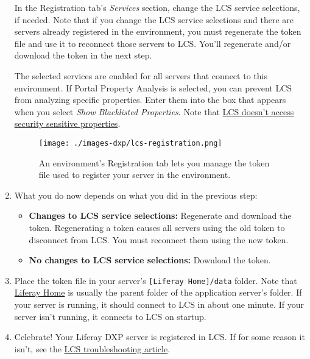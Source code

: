 \begin{enumerate}
  In the Registration tab's \emph{Services} section, change the LCS
  service selections, if needed. Note that if you change the LCS service
  selections and there are servers already registered in the
  environment, you must regenerate the token file and use it to
  reconnect those servers to LCS. You'll regenerate and/or download the
  token in the next step.

  The selected services are enabled for all servers that connect to this
  environment. If Portal Property Analysis is selected, you can prevent
  LCS from analyzing specific properties. Enter them into the box that
  appears when you select \emph{Show Blacklisted Properties}. Note that
  \href{/docs/7-0/deploy/-/knowledge_base/d/using-lcs\#what-lcs-stores-about-your-liferay-servers}{LCS
  doesn't access security sensitive properties}.

  \begin{figure}
  \centering
  \texttt{[image: ./images-dxp/lcs-registration.png]}
  \caption{An environment's Registration tab lets you manage the token
  file used to register your server in the environment.}
  \end{figure}
\item
  What you do now depends on what you did in the previous step:

  \begin{itemize}
  \tightlist
  \item
    \textbf{Changes to LCS service selections:} Regenerate and download
    the token. Regenerating a token causes all servers using the old
    token to disconnect from LCS. You must reconnect them using the new
    token.
  \item
    \textbf{No changes to LCS service selections:} Download the token.
  \end{itemize}
\item
  Place the token file in your server's
  \texttt{{[}Liferay\ Home{]}/data} folder. Note that
  \href{/docs/7-0/deploy/-/knowledge_base/d/installing-product\#liferay-home}{Liferay
  Home} is usually the parent folder of the application server's folder.
  If your server is running, it should connect to LCS in about one
  minute. If your server isn't running, it connects to LCS on startup.
\item
  Celebrate! Your Liferay DXP server is registered in LCS. If for some
  reason it isn't, see the
  \href{/docs/7-0/deploy/-/knowledge_base/d/troubleshooting-your-lcs-connection}{LCS
  troubleshooting article}.
\end{enumerate}

